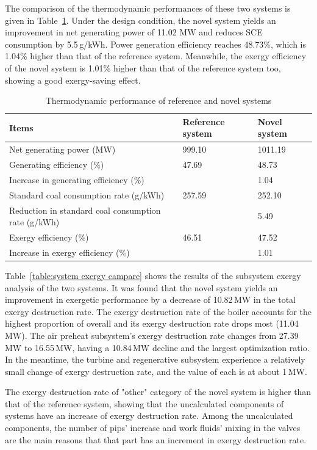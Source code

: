 \documentclass[preprint,12pt]{elsarticle}
\begin{document}
The comparison of the thermodynamic performances of these two systems is given in Table~\ref{table:thermal performance compare}.
Under the design condition, the novel system yields an improvement in net generating power of 11.02 MW and reduces SCE consumption by 5.5\,g/kWh.
Power generation efficiency reaches 48.73\%, which is 1.04\% higher than that of the reference system.
Meanwhile, the exergy efficiency of the novel system is 1.01\% higher than that of the reference system too, showing a good exergy-saving effect.


\begin{table}
\caption{Thermodynamic performance of reference and novel systems}
\label{table:thermal performance compare}
\centering
\begin{tabular}{p{7.5cm}p{1.75cm}p{1.75cm}}
\toprule 
Items & Reference system & Novel system\tabularnewline
\midrule
Net generating power (MW) & 999.10 & 1011.19\tabularnewline
Generating efficiency (\%) & 47.69 & 48.73\tabularnewline
Increase in generating efficiency (\%) &  & 1.04\tabularnewline 
Standard coal consumption rate (g/kWh) & 257.59 & 252.10\tabularnewline
Reduction in standard coal consumption rate (g/kWh) &  & 5.49\tabularnewline
Exergy efficiency (\%) & 46.51 & 47.52\tabularnewline
Increase in exergy efficiency (\%) &  & 1.01\tabularnewline
\bottomrule
\end{tabular}
\end{table}

Table~\ref{table:system exergy campare} shows the results of the subsystem exergy analysis of the two systems. 
It was found that the novel system yields an improvement in exergetic performance by a decrease of 10.82\,MW in the total exergy destruction rate.
The exergy destruction rate of the boiler accounts for the highest proportion of overall and its exergy destruction rate drops most (11.04\,MW).
The air preheat subsystem's exergy destruction rate changes from 27.39\,MW to 16.55\,MW, having a 10.84\,MW decline and the largest optimization ratio. 
In the meantime, the turbine and regenerative subsystem experience a relatively small change of exergy destruction rate, and the value of each is at about 1\,MW.  %

The exergy destruction rate of "other" category of the novel system is higher than that of the reference system, showing that the uncalculated components of systems have an increase of exergy destruction rate. 
Among the uncalculated components, the number of pips' increase and work fluids' mixing in the valves are the main reasons that that part has an increment in exergy destruction rate.
\end{document}

